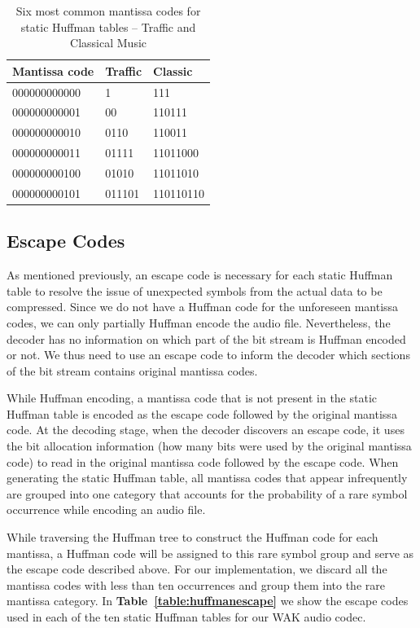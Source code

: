 \documentclass{vldb}
\begin{document}
\begin{table}[ht]
  \centering
    \begin{tabular}{ | l | l | l | }
      \hline
      Mantissa code & Traffic & Classic \\
      \hline
      000000000000     & 1      & 111       \\
      000000000001     & 00      & 110111       \\
      000000000010     & 0110      & 110011     \\
      000000000011     & 01111      & 11011000    \\
      000000000100     & 01010      & 11011010      \\
      000000000101     & 011101      & 110110110     \\
      \hline
    \end{tabular}
  \caption{Six most common mantissa codes for static Huffman tables -- Traffic and Classical Music}
  \label{table:huffmancodes3}
\end{table}

\subsection{Escape Codes}
As mentioned previously, an escape code is necessary for each static Huffman table to resolve the issue of unexpected symbols from the actual data to be compressed. Since we do not have a Huffman code for the unforeseen mantissa codes, we can only partially Huffman encode the audio file. Nevertheless, the decoder has no information on which part of the bit stream is Huffman encoded or not. We thus need to use an escape code to inform the decoder which sections of the bit stream contains original mantissa codes.

While Huffman encoding, a mantissa code that is not present in the static Huffman table is encoded as the escape code followed by the original mantissa code. At the decoding stage, when the decoder discovers an escape code, it uses the bit allocation information (how many bits were used by the original mantissa code) to read in the original mantissa code followed by the escape code. When generating the static Huffman table, all mantissa codes that appear infrequently are grouped into one category that accounts for the probability of a rare symbol occurrence while encoding an audio file.

While traversing the Huffman tree to construct the Huffman code for each mantissa, a Huffman code will be assigned to this rare symbol group and serve as the escape code described above. For our implementation, we discard all the mantissa codes with less than ten occurrences and group them into the rare mantissa category. In \textbf{Table~\ref{table:huffmanescape}} we show the escape codes used in each of the ten static Huffman tables for our WAK audio codec.
\end{document}
